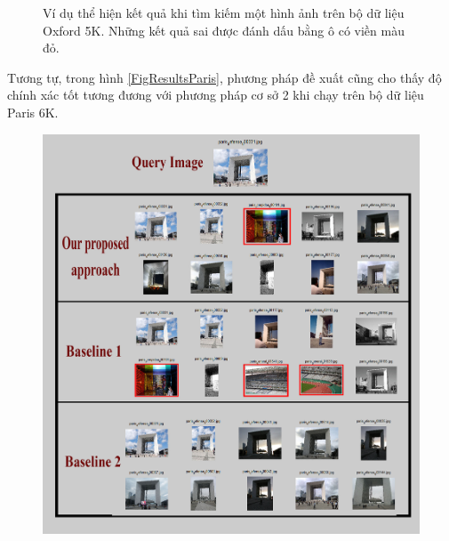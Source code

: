 \begin{figure}[!htbp]
\begin{center}
    \fi
    \caption[Ví dụ thể hiện kết quả khi tìm kiếm một hình ảnh trên bộ dữ liệu Oxford 5K]{Ví dụ thể hiện kết quả khi tìm kiếm một hình ảnh trên bộ dữ liệu Oxford 5K. Những kết quả sai được đánh dấu bằng ô có viền màu đỏ.}
    \label{FigResultsOxf}
  \end{center}
\end{figure}

Tương tự, trong hình \ref{FigResultsParis}, phương pháp đề xuất cũng cho thấy độ chính xác tốt tương đương với phương pháp cơ sở 2 khi chạy trên bộ dữ liệu Paris 6K.


\begin{figure}[!htbp]
  \begin{center}
    \leavevmode
    \ifpdf
      \includegraphics[scale=0.2]{resParis6k}
    \else

\end{center}
\end{figure}

